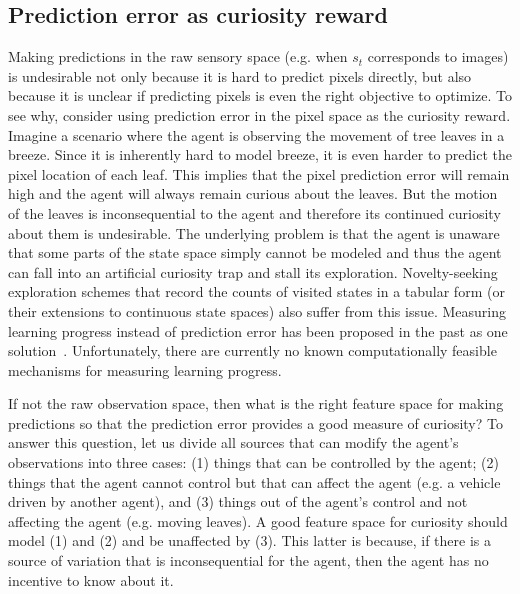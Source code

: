 \documentclass{article}
\begin{document}
\subsection{Prediction error as curiosity reward}
\label{sec:pred_err}
Making predictions in the raw sensory space (e.g. when $s_t$ corresponds to images) is undesirable not only because it is hard to predict pixels directly, but also because it is unclear if predicting pixels is even the right objective to optimize. To see why, consider using prediction error in the pixel space as the curiosity reward. Imagine a scenario where the agent is observing the movement of tree leaves in a breeze. Since it is inherently hard to model breeze, it is even harder to predict the pixel location of each leaf.
This implies that the pixel prediction error will remain high and the agent will always remain curious about the leaves. But the motion of the leaves is inconsequential to the agent and therefore its continued curiosity about them is undesirable. The underlying problem is that the agent is unaware that some parts of the state space simply cannot be modeled and thus the agent can fall into an artificial curiosity trap and stall its exploration. Novelty-seeking exploration schemes that record the counts of visited states in a tabular form (or their extensions to continuous state spaces) also suffer from this issue. Measuring learning progress instead of prediction error has been proposed in the past as one solution~\cite{schmidhuber1991possibility}. Unfortunately, there are currently no known computationally feasible mechanisms for measuring learning progress.

If not the raw observation space, then what is the right feature space for making predictions so that the prediction error provides a good measure of curiosity? To answer this question, let us divide all sources that can modify the agent's observations into three cases: (1) things that can be controlled by the agent; (2) things that the agent cannot control but that can affect the agent (e.g. a vehicle driven by another agent), and (3) things out of the agent's control and not affecting the agent (e.g. moving leaves). A good feature space for curiosity should model (1) and (2) and be unaffected by (3). This latter is because, if there is a source of variation that is inconsequential for the agent, then the agent has no incentive to know about it.
\end{document}
